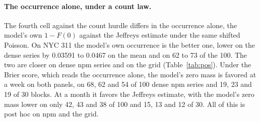 \paragraph{The occurrence alone, under a count law.} The fourth cell against the count hurdle differs in the
occurrence alone, the model's own $1 - F(0)$ against the Jeffreys estimate under the same shifted Poisson. On
NYC 311 the model's own occurrence is the better one, lower on the dense series by 0.03591 to 0.0467 on the
mean and on 62 to 73 of the 100. The two are closer on dense npm series and on the grid (Table~\ref{tab:pos}).
Under the Brier score, which reads the occurrence alone, the model's zero mass is favored at a week on both
panels, on 68, 62 and 54 of 100 dense npm series and 19, 23 and 19 of 30 blocks. At a month it favors the
Jeffreys estimate, with the model's zero mass lower on only 42, 43 and 38 of 100 and 15, 13 and 12 of 30. All
of this is post hoc on npm and the grid.
